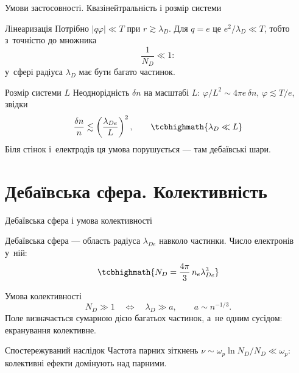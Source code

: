 \documentclass[]{beamer}
\begin{document}
\begin{frame}{Умови застосовності. Квазінейтральність і розмір системи}
	\begin{block}{Лінеаризація}\justifying\small
		Потрібно $|q\varphi|\ll T$ при $r\gtrsim\lambda_D$. Для $q=e$ це $e^2/\lambda_D\ll T$, тобто з~точністю до множника
		\begin{equation*}
			\frac1{N_D}\ll1:
		\end{equation*}
		у~сфері радіуса $\lambda_D$ має бути \alert{багато частинок}.
	\end{block}
	\begin{block}{Розмір системи $L$}\justifying\small
		Неоднорідність $\delta n$ на масштабі $L$: $\varphi/L^2\sim4\pi e\,\delta n$, $\varphi\lesssim T/e$, звідки
		\begin{equation*}
			\frac{\delta n}n\lesssim\left(\frac{\lambda_{De}}L\right)^2,\qquad
			\tcbhighmath{\lambda_D\ll L}
		\end{equation*}
		Біля стінок і~електродів ця умова порушується --- там \alert{дебаївські шари}.
	\end{block}
\end{frame}

\section{Дебаївська сфера. Колективність}

\begin{frame}{Дебаївська сфера і умова колективності}
	\begin{block}{}\justifying\small
		\alert{Дебаївська сфера} --- область радіуса $\lambda_{De}$ навколо частинки. Число електронів у~ній:
		\begin{equation*}
			\tcbhighmath{N_D=\frac{4\pi}{3}\,n_e\lambda_{De}^3}
		\end{equation*}
	\end{block}
	\begin{block}{Умова колективності}\justifying\small
		\begin{equation*}
			N_D\gg1\quad\Longleftrightarrow\quad\lambda_D\gg a,\qquad a\sim n^{-1/3}.
		\end{equation*}
		Поле визначається сумарною дією багатьох частинок, а~не одним сусідом: екранування колективне.
	\end{block}
	\begin{block}{Спостережуваний наслідок}\justifying\small
		Частота парних зіткнень $\nu\sim\omega_p\ln N_D/N_D\ll\omega_p$: колективні ефекти домінують над парними.
	\end{block}
\end{frame}
\end{document}
